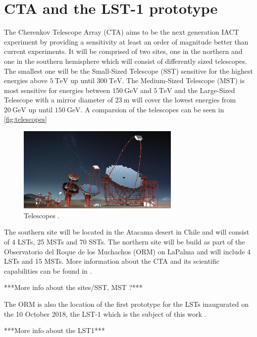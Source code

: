 \section{CTA and the LST-1 prototype}
The Cherenkov Telescope Array (CTA) aims to be the next generation IACT experiment by providing a sensitivity at least an order of magnitude better than current experiments.
It will be comprised of two sites, one in the northern and one in the southern hemisphere which will consist of differently sized telescopes. 
The smallest one will be the Small-Sized Telescope (SST) sensitive for the highest energies above $\SI{5}{\tera\electronvolt}$ up until $\SI{300}{\tera\electronvolt}$.
The Medium-Sized Telescope (MST) is most sensitive for energies between $\SI{150}{\giga\electronvolt}$ and $\SI{5}{\tera\electronvolt}$ and the 
Large-Sized Telescope with a mirror diameter of $\SI{23}{\meter}$ will cover the lowest energies from $\SI{20}{\giga\electronvolt}$ up until $\SI{150}{\giga\electronvolt}$.
A comparsion of the telescopes can be seen in \autoref{fig:telescopes}
\begin{figure}
    \centering
    \includegraphics[width=0.7\textwidth]{logos/CTA_telescopes.png}
    \caption{Telescopes \cite{cta}.}
    \label{fig:telescopes}
\end{figure}

The southern site will be located in the Atacama desert in Chile and will consist of \num{4} LSTs, \num{25} MSTs and \num{70} SSTs.
The northern site will be build as part of the Observatorio del Roque de los Muchachos (ORM) on LaPalma and will include \num{4} LSTs and \num{15} MSTs.
More information about the CTA and its scientific capabilities can be found in \cite{science_with_cta}.

***More info about the sites/SST, MST ?***

The ORM is also the location of the first prototype for the LSTs inaugurated on the 10 October 2018, the LST-1 which is the subject of this work \cite{lst_inauguration}.

***More info about the LST1***

